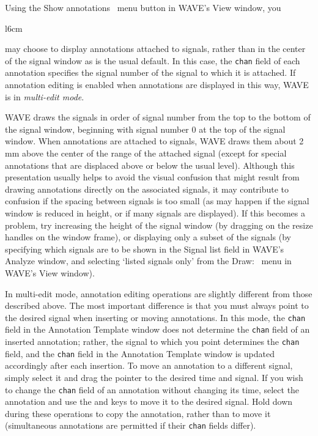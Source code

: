 \documentclass[twoside]{book}
\newcommand{\keycap}[1]{\cornersize{.5}\Ovalbox{\small\sf #1}}
\newcommand{\amenubutton}[1]{{\sf #1}~\keycap{\ensuremath{\nabla}}}
\newcommand{\WAVE}{{\sf WAVE}\xspace}
\begin{document}
Using the \amenubutton{Show annotations} menu button
in \WAVE{}'s {\sf View} window, you
\begin{wrapfigure}[6]{l}{6cm}
\mbox{}
\end{wrapfigure}
may choose to display annotations attached to signals, rather than
in the center of the signal window as is the usual default.  In this case, the
{\tt chan} field of each annotation specifies the signal number of the signal
to which it is attached.  If annotation editing is enabled when annotations
are displayed in this way, \WAVE{} is in \emph{multi-edit mode}.

\WAVE{} draws the signals in order of signal number from the top to
the bottom of the signal window, beginning with signal number 0 at the
top of the signal window.  When annotations are attached to signals,
\WAVE{} draws them about 2 mm above the center of the range of the
attached signal (except for special annotations that are displaced
above or below the usual level).  Although this presentation usually
helps to avoid the visual confusion that might result from drawing
annotations directly on the associated signals, it may contribute to
confusion if the spacing between signals is too small (as may happen
if the signal window is reduced in height, or if many signals are
displayed).  If this becomes a problem, try increasing the height of
the signal window (by dragging on the resize handles on the window
frame), or displaying only a subset of the signals (by specifying
which signals are to be shown in the {\sf Signal list} field in \WAVE{}'s
{\sf Analyze} window, and selecting `{\sf listed signals only}' from the
\amenubutton{Draw:} menu in WAVE's {\sf View} window).

In multi-edit mode, annotation editing operations are slightly
different from those described above.  The most important difference
is that you must always point to the desired signal when inserting or
moving annotations.  In this mode, the {\tt chan} field in the {\sf Annotation
Template} window does not determine the {\tt chan} field of an inserted
annotation; rather, the signal to which you point determines the
{\tt chan} field, and the {\tt chan} field in the {\sf Annotation Template}
window is updated accordingly after each insertion.  To move an annotation to
a different signal, simply select it and drag the pointer to the
desired time and signal.  If you wish to change the {\tt chan} field of an
annotation without changing its time, select the annotation and use
the \keycap{$\uparrow$} and \keycap{$\downarrow$} keys to move it to the
desired signal.  Hold down \keycap{Ctrl} during these operations to copy the
annotation, rather than to move it (simultaneous annotations are
permitted if their {\tt chan} fields differ).
\end{document}

